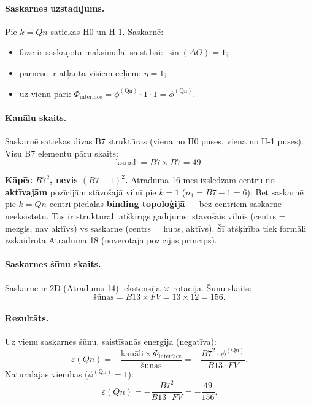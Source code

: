 \documentclass[12pt,a4paper]{article}
\begin{document}
\paragraph{Saskarnes uzstādījums.}
Pie $k = Qn$ satiekas H0 un H-1. Saskarnē:
\begin{itemize}
    \item fāze ir saskaņota maksimālai saistībai: $\sin(\Delta\Theta) = 1$;
    \item pārnese ir atļauta visiem ceļiem: $\eta = 1$;
    \item uz vienu pāri: $\Phi_{\text{interface}} = \phi^{(\text{Qn})} \cdot 1 \cdot 1 = \phi^{(\text{Qn})}$.
\end{itemize}

\paragraph{Kanālu skaits.}
Saskarnē satiekas divas B7 struktūras (viena no H0 puses, viena no H-1 puses). Visu B7 elementu pāru skaits:
\[
\text{kanāli} = B7 \times B7 = 49.
\]

\textbf{Kāpēc $B7^2$, nevis $(B7-1)^2$.} Atradumā 16 mēs izslēdzām centru no \textbf{aktīvajām} pozīcijām stāvošajā vilnī pie $k=1$ ($n_1 = B7-1 = 6$). Bet saskarnē pie $k=Qn$ centri piedalās \textbf{binding topoloģijā} — bez centriem saskarne neeksistētu. Tas ir strukturāli atšķirīgs gadījums: stāvošais vilnis (centrs = mezgls, nav aktīvs) vs saskarne (centrs = hubs, aktīvs). Šī atšķirība tiek formāli izskaidrota Atradumā 18 (novērotāja pozīcijas princips).

\paragraph{Saskarnes šūnu skaits.}
Saskarne ir 2D (Atradums 14): ekstensija × rotācija. Šūnu skaits:
\[
\text{šūnas} = B13 \times FV = 13 \times 12 = 156.
\]

\paragraph{Rezultāts.}
Uz vienu saskarnes šūnu, saistīšanās enerģija (negatīva):
\[
\varepsilon(Qn) = -\frac{\text{kanāli} \times \Phi_{\text{interface}}}{\text{šūnas}} = -\frac{B7^2 \cdot \phi^{(\text{Qn})}}{B13 \cdot FV}.
\]
Naturālajās vienībās ($\phi^{(\text{Qn})} = 1$):
\[
\boxed{\;\varepsilon(Qn) = -\frac{B7^2}{B13 \cdot FV} = -\frac{49}{156}.\;}
\]
\end{document}
